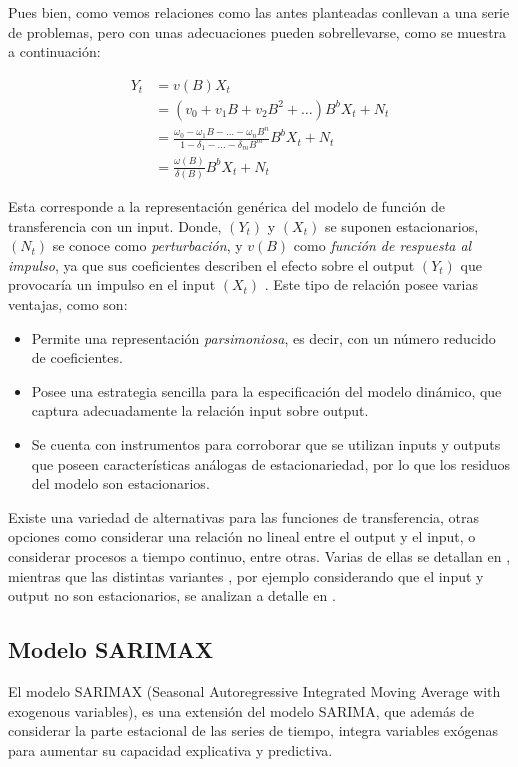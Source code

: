 \documentclass[12pt,oneside]{book}\usepackage[]{graphicx}\usepackage[]{color}
\theoremstyle{definition} %
\begin{document}
Pues bien, como vemos relaciones como las antes planteadas conllevan a una serie de problemas, pero con unas adecuaciones pueden sobrellevarse, como se muestra a continuación:

\begin{equation} \label{eq:fun_transfer}
\begin{split}
Y_t & = v(B)X_t \\
&  =  (v_0+v_1B+v_2B^2+\dots )B^b X_t + N_t \\
&  = \frac{\omega_0-\omega_1B- \dots -\omega_n B^n}{1-\delta_1-\dots -\delta_m B^m} B^b X_t + N_t \\
& = \frac{\omega(B)}{\delta(B)}B^b X_t + N_t
\end{split}
\end{equation}

Esta corresponde a la representación genérica del modelo de función de transferencia con un input. Donde, $(Y_t)$ y $(X_t)$ se suponen estacionarios,  $(N_t)$ se conoce como \textit{perturbación}, y $v(B)$ como \textit{función de respuesta al impulso}, ya que sus coeficientes describen el efecto sobre el output $(Y_t)$ que provocaría un impulso en el input $(X_t)$ . Este tipo de relación posee varias ventajas, como son:

\begin{itemize}
\item Permite una representación \textit{parsimoniosa}, es decir, con un número reducido de coeficientes.
\item Posee una estrategia sencilla para la especificación del modelo dinámico, que captura adecuadamente la relación input sobre output.
\item Se cuenta con instrumentos para corroborar que se utilizan inputs y outputs que poseen características análogas de estacionariedad, por lo que los residuos del modelo son estacionarios.
\end{itemize} 

Existe una variedad de alternativas para las funciones de transferencia, otras opciones como considerar una relación no lineal entre el output y el input, o considerar procesos a tiempo continuo, entre otras. Varias de ellas se detallan en \cite[Capitulo~5]{box2015time}, mientras que las distintas variantes , por ejemplo considerando que el input y output no son estacionarios, se analizan a detalle en \cite{pankratz2012forecasting}.



\subsection{Modelo SARIMAX}
El modelo SARIMAX (Seasonal Autoregressive Integrated Moving Average with exogenous variables), es una extensión del modelo SARIMA, que además de considerar la parte estacional de las series de tiempo, integra variables exógenas para aumentar su capacidad explicativa y predictiva. 
\end{document}
